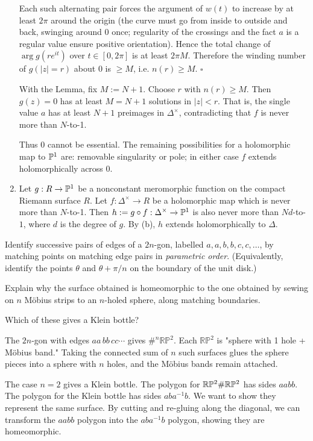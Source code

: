 \documentclass[12pt]{article}  %
\begin{document}
\begin{solution}
\begin{enumerate}
  Each such alternating pair forces the argument of $w(t)$ to increase by at least $2\pi$ around the origin (the curve must go from inside to outside and back, swinging around 0 once; regularity of the crossings and the fact $a$ is a regular value ensure positive orientation). Hence the total change of $\arg g(re^{it})$ over $t\in[0,2\pi]$ is at least $2\pi M$. Therefore the winding number of $g(|z|=r)$ about 0 is $\ge M$, i.e. $n(r)\ge M$. $\square$

  With the Lemma, fix $M:=N+1$. Choose $r$ with $n(r)\ge M$. Then $g(z)=0$ has at least $M=N+1$ solutions in $|z|<r$. That is, the single value $a$ has at least $N+1$ preimages in $\Delta^\times$, contradicting that $f$ is never more than $N$-to-1.

  Thus 0 cannot be essential. The remaining possibilities for a holomorphic map to $\P^1$ are: removable singularity or pole; in either case $f$ extends holomorphically across 0.
  \item Let $g:R \to \P^1$ be a nonconstant meromorphic function on the compact Riemann surface $R$. Let $f:\Delta^\times \to R$ be a holomorphic map which is never more than $N$-to-1. Then $h:=g\circ f:\Delta^\times \to \P^1$ is also never more than $Nd$-to-$1$, where $d$ is the degree of $g$. By (b), $h$ extends holomorphically to $\Delta$.
\end{enumerate}
\end{solution}

\begin{problem}[2 ]
Identify successive pairs of edges of a $2n$-gon, labelled $a,a,b,b,c,c,\dots$, by matching points on matching edge pairs in \emph{parametric order}. (Equivalently, identify the points $\theta$ and $\theta+\pi/n$ on the boundary of the unit disk.) 

Explain why the surface obtained is homeomorphic to the one obtained by sewing on $n$ M{\"o}bius strips to an $n$-holed sphere, along matching boundaries. 

Which of these gives a Klein bottle?
\end{problem}

\begin{solution}
The $2n$-gon with edges $aa\,bb\,cc\cdots$ gives $\#^n \mathbb{RP}^2$. Each $\mathbb{RP}^2$ is "sphere with 1 hole + Möbius band." Taking the connected sum of $n$ such surfaces glues the sphere pieces into a sphere with $n$ holes, and the Möbius bands remain attached.

The case $n=2$ gives a Klein bottle. The polygon for $\R\P^2 \# \R\P^2$ has sides $aabb$. The polygon for the Klein bottle has sides $aba^{-1}b$. We want to show they represent the same surface. By cutting and re-gluing along the diagonal, we can transform the $aabb$ polygon into the $aba^{-1}b$ polygon, showing they are homeomorphic.
\end{solution}
\end{document}
